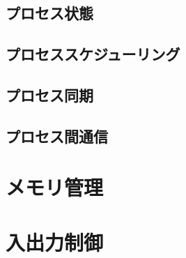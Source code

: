 \subsection{プロセス状態}


\subsection{プロセススケジューリング}

\subsection{プロセス同期}

\subsection{プロセス間通信}

\section{メモリ管理}

\section{入出力制御}
